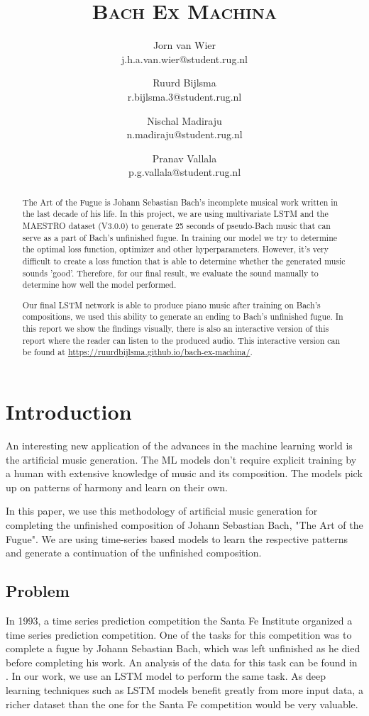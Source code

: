 \documentclass[11pt, twocolumn]{article}
\title{\vspace{1.5cm}\textbf{\scshape{Bach Ex Machina}}}
\author{
    Jorn van Wier\\
    \small j.h.a.van.wier@student.rug.nl
    
    \and 
    
    Ruurd Bijlsma\\
    \small r.bijlsma.3@student.rug.nl
    
    \and 
    
    Nischal Madiraju\\
    \small n.madiraju@student.rug.nl
    
    \and 
    
    Pranav Vallala\\
    \small p.g.vallala@student.rug.nl
}
\date{}
\begin{document}

\maketitle

\thispagestyle{firstpage}

\begin{abstract}
\noindent
The Art of the Fugue is Johann Sebastian Bach's incomplete musical work written in the last decade of his life. In this project, we are using multivariate LSTM and the MAESTRO dataset (V3.0.0) to generate 25 seconds of pseudo-Bach music that can serve as a part of Bach's unfinished fugue. 
In training our model we try to determine the optimal loss function, optimizer and other hyperparameters. However, it's very difficult to create a loss function that is able to determine whether the generated music sounds 'good'. Therefore, for our final result, we evaluate the sound manually to determine how well the model performed.

Our final LSTM network is able to produce piano music after training on Bach's compositions, we used this ability to generate an ending to Bach's unfinished fugue. \ifpdf
In this report we show the findings visually, there is also an interactive version of this report where the reader can listen to the produced audio. This interactive version can be found at \url{https://ruurdbijlsma.github.io/bach-ex-machina/}.
\fi

\end{abstract}
\section{Introduction}
An interesting new application of the advances in the machine learning world is the artificial music generation. The ML models don't require explicit training by a human with extensive knowledge of music and its composition. The models pick up on patterns of harmony and learn on their own. 

In this paper, we use this methodology of artificial music generation for completing the unfinished composition of Johann Sebastian Bach, "The Art of the Fugue". We are using time-series based models to learn the respective patterns and generate a continuation of the unfinished composition. 
\subsection{Problem}
In 1993, a time series prediction competition the Santa Fe Institute organized a time series prediction competition. One of the tasks for this competition was to complete a fugue by Johann Sebastian Bach, which was left unfinished as he died before completing his work. 
An analysis of the data for this task can be found in \cite{dirstt1993baroque}. In our work, we use an LSTM model to perform the same task. As deep learning techniques such as LSTM models benefit greatly from more input data, a richer dataset than the one for the Santa Fe competition would be very valuable.
\end{document}
